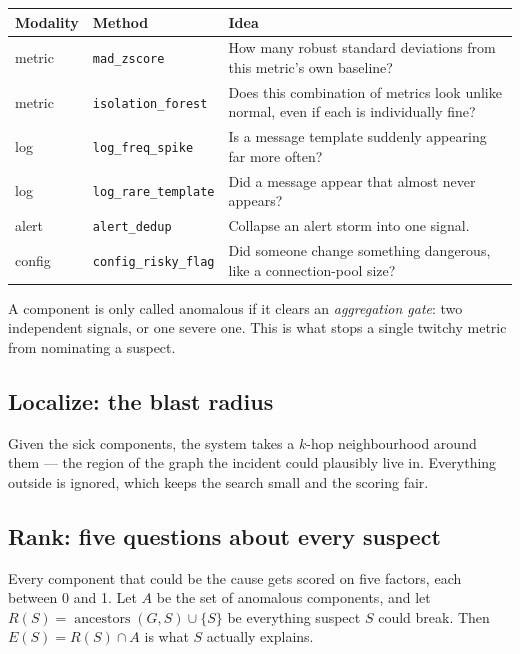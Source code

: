 \documentclass[11pt,a4paper]{article}
\newcommand{\code}[1]{\texttt{\small #1}}
\begin{document}
\begin{center}
\footnotesize
\begin{tabular}{@{}ll p{7.6cm}@{}}
\toprule
\textbf{Modality} & \textbf{Method} & \textbf{Idea} \\
\midrule
metric & \code{mad\_zscore} & How many robust standard deviations from this metric's own baseline? \\
metric & \code{isolation\_forest} & Does this combination of metrics look unlike normal, even if each is individually fine? \\
log    & \code{log\_freq\_spike} & Is a message template suddenly appearing far more often? \\
log    & \code{log\_rare\_template} & Did a message appear that almost never appears? \\
alert  & \code{alert\_dedup} & Collapse an alert storm into one signal. \\
config & \code{config\_risky\_flag} & Did someone change something dangerous, like a connection-pool size? \\
\bottomrule
\end{tabular}
\end{center}

A component is only called anomalous if it clears an \emph{aggregation gate}:
two independent signals, or one severe one. This is what stops a single twitchy
metric from nominating a suspect.

\subsection{Localize: the blast radius}

Given the sick components, the system takes a $k$-hop neighbourhood around them
--- the region of the graph the incident could plausibly live in. Everything
outside is ignored, which keeps the search small and the scoring fair.

\subsection{Rank: five questions about every suspect}

Every component that could be the cause gets scored on five factors, each
between 0 and 1. Let $A$ be the set of anomalous components, and let
$R(S) = \operatorname{ancestors}(G,S) \cup \{S\}$ be everything suspect $S$
could break. Then $E(S) = R(S) \cap A$ is what $S$ actually explains.
\end{document}
